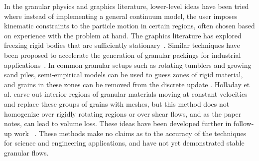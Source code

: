 In the granular physics and graphics literature, lower-level ideas have been tried where instead of implementing a
general continuum model, the user imposes kinematic constraints to the particle motion in certain regions, often chosen
based on experience with the problem at hand. The graphics literature has explored freezing rigid bodies that are
sufficiently stationary~\cite{Smith:2005}. Similar techniques have been proposed to accelerate the generation of
granular packings for industrial applications~\cite{Mio:2009}. In common granular setups such as rotating tumblers and
growing sand piles, semi-empirical models can be used to guess zones of rigid material, and grains in these zones can be
removed from the discrete update \cite{McCarthy:1998,Hsu:2010,Zhu:2010,Bouchaud:1994}. Holladay et al.\cite{Holladay:2012}
carve out interior regions of granular materials moving at constant velocities and replace these groups of grains with
meshes, but this method does not homogenize over rigidly rotating regions or over shear flows, and as the paper notes,
can lead to volume loss. These ideas have been developed further in follow-up work ~\cite{Holladay:2013,Munns:2015}.
These methods make no claims as to the accuracy of the techniques for science and engineering applications, and have not
yet demonstrated stable granular flows.

